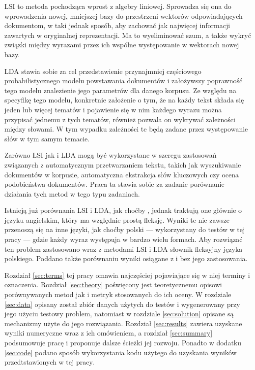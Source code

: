 \documentclass[11pt,a4paper]{article}
\begin{document}
LSI to metoda pochodząca wprost z algebry liniowej. Sprowadza się ona do
wprowadzenia nowej, mniejszej bazy do przestrzeni wektorów odpowiadających
dokumentom, w taki jednak sposób, aby zachować jak najwięcej informacji
zawartych w oryginalnej reprezentacji. Ma to wyeliminować szum, a także wykryć
związki między wyrazami przez ich wspólne występowanie w wektorach nowej bazy.

LDA stawia sobie za cel przedstawienie przynajmniej częściowego
probabilistycznego modelu powstawania dokumentów i założywszy poprawność tego
modelu znalezienie jego parametrów dla danego korpusu. Ze względu na specyfikę
tego modelu, konkretnie założenie o tym, że na każdy tekst składa się jeden lub
więcej tematów i pojawienie się w nim każdego wyrazu można przypisać jednemu z
tych tematów, również pozwala on wykrywać zależności między słowami. W tym
wypadku zależności te będą zadane przez występowanie słów w tym samym temacie.

Zarówno LSI jak i LDA mogą być wykorzystane w szeregu zastosowań związanych z
automatycznym przetwarzaniem tekstu, takich jak wyszukiwanie dokumentów w
korpusie, automatyczna ekstrakcja słów kluczowych czy ocena podobieństwa
dokumentów. Praca ta stawia sobie za zadanie porównanie działania tych metod
w tego typu zadaniach.

Istnieją już porównania LSI i LDA, jak choćby \cite{lda-paper}, jednak traktują
one głównie o języku angielskim, który ma względnie prostą fleksję. Wyniki te
nie zawsze przenoszą się na inne języki, jak choćby polski --- wykorzystany do
testów w tej pracy --- gdzie każdy wyraz występuja w bardzo wielu formach. Aby
rozwiązać ten problem zastosowano wraz z metodami LSI i LDA słownik fleksyjny
języka polskiego. Poddano także porównaniu wyniki osiągane z i bez jego
zastosowania.

Rozdział \ref{sec:terms} tej pracy omawia najczęściej pojawiające się w niej
terminy i oznaczenia.  Rozdział \ref{sec:theory} poświęcony jest teoretycznemu
opisowi porównywanych metod jak i metryk stosowanych do ich oceny. W rozdziale
\ref{sec:data} opisany został zbiór danych użytych do testów i wygenerowany
przy jego użyciu testowy problem, natomiast w rozdziale \ref{sec:solution}
opisane są mechanizmy użyte do jego rozwiązania. Rozdział \ref{sec:results}
zawiera uzyskane wyniki numeryczne wraz z ich omówieniem, a rozdział
\ref{sec:summary} podsumowuje pracę i proponuje dalsze ścieżki jej rozwoju.
Ponadto w dodatku \ref{sec:code} podano sposób wykorzystania kodu użytego do
uzyskania wyników przedtstawionych w tej pracy.
\end{document}
